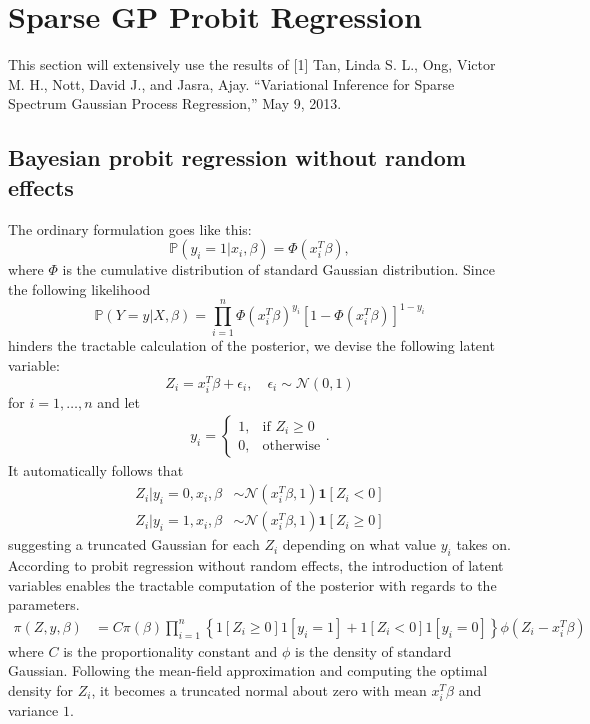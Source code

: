 \documentclass[11pt]{article}
\newcommand{\bs}{\boldsymbol}
\begin{document}
\section{Sparse GP Probit Regression}
This section will extensively use the results of [1] Tan, Linda S. L., Ong, Victor M. H., Nott, David J., and Jasra, Ajay. “Variational Inference for Sparse Spectrum Gaussian Process Regression,” May 9, 2013.
\subsection{Bayesian probit regression without random effects}
The ordinary formulation goes like this:
$$
  \mathbb{P}\left(y_{i}=1|x_{i}, \beta\right) = \Phi\left(x_{i}^{T}\beta\right),
$$
where $\Phi$ is the cumulative distribution of standard Gaussian distribution. Since the following likelihood
$$
  \mathbb{P}\left(Y=y|X, \beta\right) = \prod_{i=1}^{n}\Phi\left(x_{i}^{T}\beta\right)^{y_{i}}\left[1-\Phi\left(x_{i}^{T}\beta\right)\right]^{1-y_{i}}
$$
hinders the tractable calculation of the posterior, we devise the following latent variable:
$$
  Z_{i} = x_{i}^{T}\beta + \epsilon_{i}, \quad \epsilon_{i} \sim \mathcal{N}\left(0, 1\right)
$$
for $i = 1, \ldots , n$ and let
\begin{align*}
  y_{i} = \begin{cases}1, & \text{if $Z_{i} \ge 0$}\\ 0, & \text{otherwise} \end{cases}.
\end{align*}
It automatically follows that
\begin{align*}
  Z_{i}|y_{i}=0, x_{i}, \beta &\sim \mathcal{N}\left(x_{i}^{T}\beta, 1\right) \bs{1}\left[Z_{i} < 0\right]\\
  Z_{i}|y_{i}=1, x_{i}, \beta &\sim \mathcal{N}\left(x_{i}^{T}\beta, 1\right) \bs{1}\left[Z_{i}\ge 0\right]
\end{align*}
suggesting a truncated Gaussian for each $Z_{i}$ depending on what value $y_{i}$ takes on. According to probit regression without random effects, the introduction of latent variables enables the tractable computation of the posterior with regards to the parameters.
\begin{align*}
  \pi\left(Z, y, \beta\right) &= C\pi\left(\beta\right)\prod_{i=1}^{n}\left\{1\left[Z_{i}\ge 0\right]1\left[y_{i}=1\right] + 1\left[Z_{i}<0\right]1\left[y_{i}=0\right] \right\}\phi\left(Z_{i} - x_{i}^{T}\beta\right)
\end{align*}
where $C$ is the proportionality constant and $\phi$ is the density of standard Gaussian. Following the mean-field approximation and computing the optimal density for $Z_{i}$, it becomes a truncated normal about zero with mean $x_{i}^{T}\beta$ and variance $1$.
\end{document}
